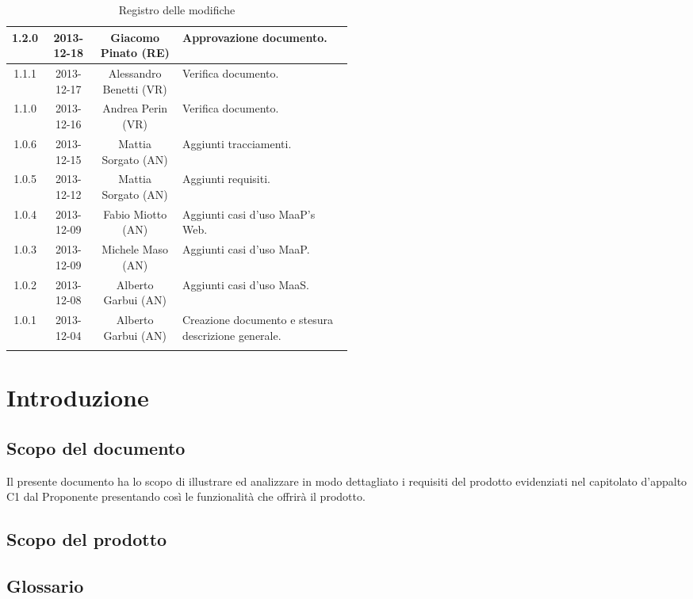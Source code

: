 \begin{center}
\begin{longtable}{|c|c|c|p{0.5\linewidth}|}
\midrule
1.2.0 & 2013-12-18 & Giacomo Pinato (RE) & Approvazione documento.\\
\midrule
1.1.1 & 2013-12-17 & Alessandro Benetti (VR) & Verifica documento.\\
\midrule
1.1.0 & 2013-12-16 & Andrea Perin (VR) & Verifica documento.\\
\midrule
1.0.6 & 2013-12-15 & Mattia Sorgato (AN) & Aggiunti tracciamenti.\\
\midrule
1.0.5 & 2013-12-12 & Mattia Sorgato (AN) & Aggiunti requisiti.\\
\midrule
1.0.4 & 2013-12-09 & Fabio Miotto (AN) & Aggiunti casi d'uso MaaP's Web.\\
\midrule
1.0.3 & 2013-12-09 & Michele Maso (AN) & Aggiunti casi d'uso MaaP.\\
\midrule
1.0.2 & 2013-12-08 & Alberto Garbui (AN) & Aggiunti casi d'uso MaaS.\\
\midrule
1.0.1 & 2013-12-04 & Alberto Garbui (AN) & Creazione documento e stesura descrizione generale.\\

\bottomrule
\caption{Registro delle modifiche}
\label{tab:changelog}
\end{longtable}
\end{center}

\newpage
\tableofcontents

\newpage
\listoftables
\listoffigures

\newpage
\section{Introduzione}%
\subsection{Scopo del documento}%
Il presente documento ha lo scopo di illustrare ed analizzare in modo dettagliato i requisiti del prodotto  evidenziati nel capitolato d'appalto C1 dal Proponente \Prop{} presentando così le funzionalità che offrirà il prodotto.

\subsection{Scopo del prodotto} %
\Prodotto{}
\subsection{Glossario}%
\Glossario{}

